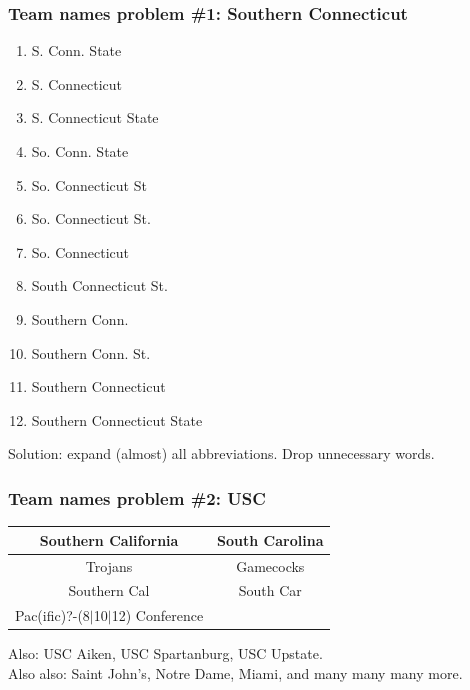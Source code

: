 \documentclass{beamer}
\begin{document}
\begin{frame}
\frametitle{Team names problem \#1: Southern Connecticut}
\begin{multicols}{2}
\begin{enumerate}
\item S. Conn. State
\item S. Connecticut
\item S. Connecticut State
\item So. Conn. State
\item So. Connecticut St
\item So. Connecticut St.
\item So. Connecticut
\item South Connecticut St.
\item Southern Conn.
\item Southern Conn. St.
\item Southern Connecticut
\item Southern Connecticut State
\end{enumerate}
\end{multicols}
Solution: expand (almost) all abbreviations.  Drop unnecessary words.
\end{frame}

\begin{frame}
\frametitle{Team names problem \#2: USC}
\begin{center}
\begin{tabular}{c @{\qquad} c}\toprule
Southern California & South Carolina \\\midrule
Trojans & Gamecocks \\
Southern Cal & South Car \\
Pac(ific)?-(8$|$10$|$12) Conference \\\bottomrule
\end{tabular}
\end{center}
Also: USC Aiken, USC Spartanburg, USC Upstate.\\\bigskip
Also also: Saint John's, Notre Dame, Miami, and many many many more.
\end{frame}
\end{document}
